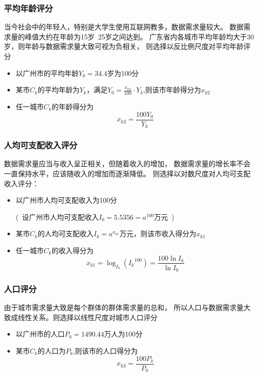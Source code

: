 \documentclass[UTF8,12pt]{ctexart}
\begin{document}
        \subsubsection{平均年龄评分}
            当今社会中的年轻人，特别是大学生使用互联网教多，数据需求量较大。
            数据需求量的峰值大约在年龄为15岁~25岁之间达到。
            广东省内各城市平均年龄均大于30岁，则年龄与数据需求量大致可视为负相关，
            则选择以反比例尺度对平均年龄评分
            \begin{itemize}
                \item 以广州市的平均年龄$Y_0=34.4$岁为100分
                \item 某市$C_k$的平均年龄为$Y_k$，满足$Y_0=\displaystyle\frac{x_{k2}}{100}·Y_k$,则该市年龄得分为$x_{k2}$
                \item 任一城市$C_k$的年龄得分为$$x_{k2}=\frac{100Y_0}{Y_k}$$
            \end{itemize}

        \subsubsection{人均可支配收入评分}
            数据需求量应当与收入呈正相关，但随着收入的增加，
            数据需求量的增长率不会一直保持水平，应该随收入的增加而逐渐降低。
            则选择以对数尺度对人均可支配收入评分：
            \begin{itemize}
                \item 以广州市人均可支配收入为100分\par 
                    (\ 设广州市人均可支配收入$I_0=5.5356=a^{100}$万元\ )
                \item 某市$C_k$的人均可支配收入$I_k=a^{x_{k1}}$万元，则该市收入得分为$x_{k1}$
                \item 任一城市$C_k$的收入得分为$$x_{k1}=\log _{I_0}({I_k}^{100})=\frac{100\ln I_k}{\ln I_0}$$
            \end{itemize}

        \subsubsection{人口评分}
            由于城市需求量大致是每个群体的群体需求量的总和，
            所以人口与数据需求量大致成线性关系。则选择以线性尺度对城市人口评分
            \begin{itemize}
                \item 以广州市的人口$P_0=1490.44$万人为100分
                \item 某市$C_k$的人口为$P_k$,则该市的人口得分为$$x_{k3}=\frac{100P_k}{P_0}$$
            \end{itemize}
 
\end{document}

